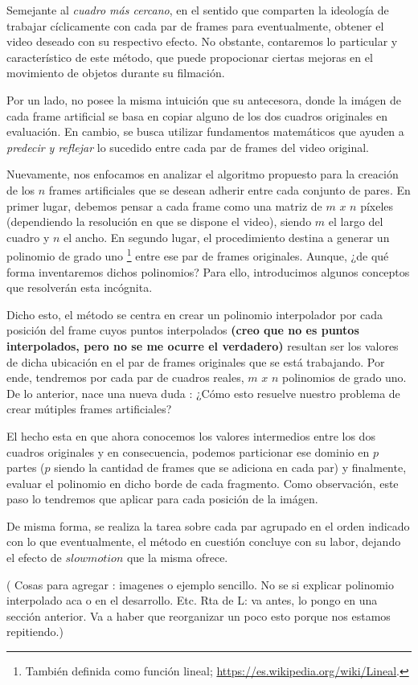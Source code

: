 Semejante al \textit{cuadro m\'as cercano}, en el sentido que comparten la ideolog\'ia de trabajar c\'iclicamente con cada par de frames para eventualmente, obtener el video deseado con su respectivo efecto. No obstante, contaremos lo particular y caracter\'istico de este m\'etodo, que puede propocionar ciertas mejoras en el movimiento de objetos durante su filmaci\'on.

Por un lado, no posee la misma intuici\'on que su antecesora, donde la im\'agen de cada frame artificial se basa en copiar alguno de los dos cuadros originales en evaluaci\'on. En cambio, se busca utilizar fundamentos matem\'aticos que ayuden a \textit{predecir y reflejar} lo sucedido entre cada par de frames del video original. 

Nuevamente, nos enfocamos en analizar el algoritmo propuesto para la creaci\'on de los $n$ frames artificiales que se desean adherir entre cada conjunto de pares. En primer lugar, debemos pensar a cada frame como una matriz de $m$ $x$ $n$ p\'ixeles (dependiendo la resoluci\'on en que se dispone el video), siendo $m$ el largo del cuadro y $n$ el ancho. En segundo lugar, el procedimiento destina a generar un polinomio de grado uno \footnote{ Tambi\'en definida como funci\'on lineal; \url{https://es.wikipedia.org/wiki/Lineal}.} entre ese par de frames originales. Aunque, ¿de qu\'e forma inventaremos dichos polinomios? Para ello, introducimos algunos conceptos que resolver\'an esta inc\'ognita.

Dicho esto, el m\'etodo se centra en crear un polinomio interpolador por cada posici\'on del frame cuyos puntos interpolados \textbf{(creo que no es puntos interpolados, pero no se me ocurre el verdadero)} resultan ser los valores de dicha ubicaci\'on en el par de frames originales que se est\'a trabajando. Por ende, tendremos por cada par de cuadros reales, $m$ $x$ $n$ polinomios de grado uno. De lo anterior, nace una nueva duda : ¿C\'omo esto resuelve nuestro problema de crear m\'utiples frames artificiales?

El hecho esta en que ahora conocemos los valores intermedios entre los dos cuadros originales y en consecuencia, podemos particionar ese dominio en $p$ partes ($p$ siendo la cantidad de frames que se adiciona en cada par) y finalmente, evaluar el polinomio en dicho borde de cada fragmento. Como observaci\'on, este paso lo tendremos que aplicar para cada posici\'on de la im\'agen.

De misma forma, se realiza la tarea sobre cada par agrupado en el orden indicado con lo que eventualmente, el m\'etodo en cuesti\'on concluye con su labor, dejando el efecto de $slowmotion$ que la misma ofrece.

( Cosas para agregar : imagenes o ejemplo sencillo. No se si explicar polinomio interpolado aca o en el desarrollo. Etc. Rta de L: va antes, lo pongo en una sección anterior. Va a haber que reorganizar un poco esto porque nos estamos repitiendo.) 